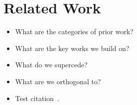\section{Related Work}\label{sec:relwork}

\begin{itemize}
  \item What are the categories of prior work?
  \item What are the key works we build on?
  \item What do we supercede?
  \item What are we orthogonal to?
  \item Test citation~\cite{ICALP:KolSch08}.

\end{itemize}
